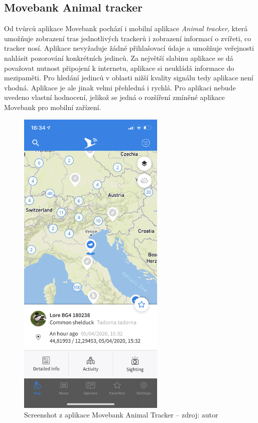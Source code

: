 \subsection{Movebank Animal tracker}

Od tvůrců aplikace Movebank pochází i mobilní aplikace \emph{Animal tracker}, která umožňuje zobrazení tras jednotlivých trackerů i zobrazení informací o zvířeti, co tracker nosí. Aplikace nevyžaduje žádné přihlašovací údaje a umožňuje veřejnosti nahlásit pozorování konkrétních jedinců. Za největší slabinu aplikace se dá považovat nutnost připojení k internetu, aplikace si neukládá informace do mezipaměti. Pro hledání jedinců v oblasti nižší kvality signálu tedy aplikace není vhodná. Aplikace je ale jinak velmi přehledná i rychlá. Pro aplikaci nebude uvedeno vlastní hodnocení, jelikož se jedná o rozšíření zmíněné aplikace Movebank pro mobilní zařízení.

\begin{figure}[H]
	\begin{center}
		\includegraphics[width=70mm]{img/animaltracker_app_movebank.png}
	\end{center}
	\caption[Screenshot z aplikace Movebank Animal Tracker]{Screenshot z aplikace Movebank Animal Tracker -- zdroj: autor}
	\label{fig:movebank}
\end{figure}

